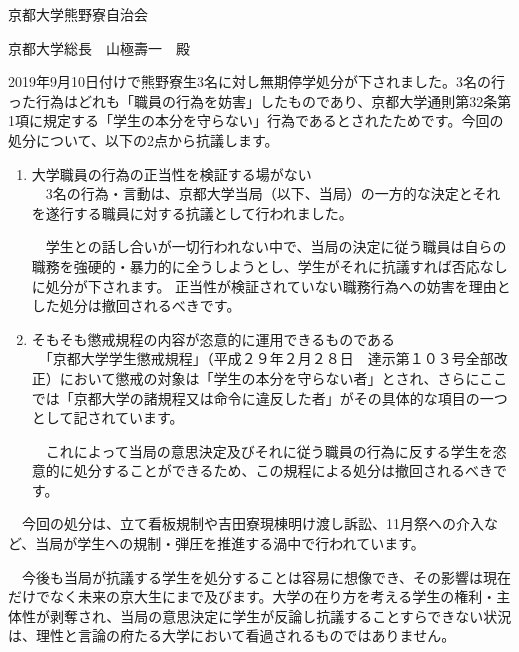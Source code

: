 {\small
\begin{tcolorbox}[colback=white, colbacktitle=gray!30!white, coltitle=black, title=熊野寮生３名に対する無期停学処分の撤回を求める声明,breakable]

    \begin{flushright}
    京都大学熊野寮自治会
    \end{flushright}
    \begin{flushleft}
    京都大学総長　山極壽一　殿 
    \end{flushleft}
    
    2019年9月10日付けで熊野寮生3名に対し無期停学処分が下されました。3名の行った行為はどれも「職員の行為を妨害」したものであり、京都大学通則第32条第1項に規定する「学生の本分を守らない」行為であるとされたためです。今回の処分について、以下の2点から抗議します。
    
    \begin{enumerate}
        \item 大学職員の行為の正当性を検証する場がない\\
        　3名の行為・言動は、京都大学当局（以下、当局）の一方的な決定とそれを遂行する職員に対する抗議として行われました。
    
        　学生との話し合いが一切行われない中で、当局の決定に従う職員は自らの職務を強硬的・暴力的に全うしようとし、学生がそれに抗議すれば否応なしに処分が下されます。
        正当性が検証されていない職務行為への妨害を理由とした処分は撤回されるべきです。
        
        \item そもそも懲戒規程の内容が恣意的に運用できるものである\\
        　「京都大学学生懲戒規程」（平成２９年２月２８日　達示第１０３号全部改正）において懲戒の対象は「学生の本分を守らない者」とされ、さらにここでは「京都大学の諸規程又は命令に違反した者」がその具体的な項目の一つとして記されています。
    
        　これによって当局の意思決定及びそれに従う職員の行為に反する学生を恣意的に処分することができるため、この規程による処分は撤回されるべきです。
    \end{enumerate}
    
    　今回の処分は、立て看板規制や吉田寮現棟明け渡し訴訟、11月祭への介入など、当局が学生への規制・弾圧を推進する渦中で行われています。
    
    　今後も当局が抗議する学生を処分することは容易に想像でき、その影響は現在だけでなく未来の京大生にまで及びます。大学の在り方を考える学生の権利・主体性が剥奪され、当局の意思決定に学生が反論し抗議することすらできない状況は、理性と言論の府たる大学において看過されるものではありません。
    

\end{tcolorbox}}
